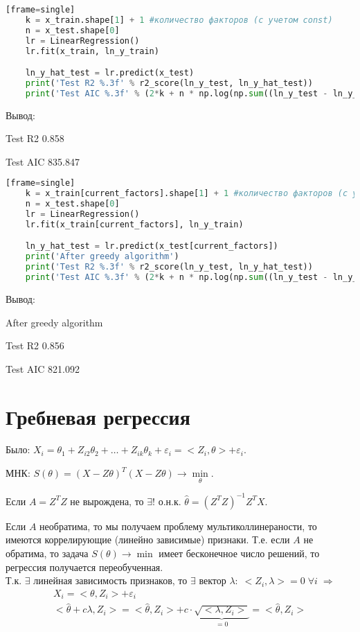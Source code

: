 \begin{lstlisting}[language=Python][frame=single]
	k = x_train.shape[1] + 1 #количество факторов (с учетом const)
	n = x_test.shape[0]
	lr = LinearRegression()
	lr.fit(x_train, ln_y_train)

	ln_y_hat_test = lr.predict(x_test)
	print('Test R2 %.3f' % r2_score(ln_y_test, ln_y_hat_test))
	print('Test AIC %.3f' % (2*k + n * np.log(np.sum((ln_y_test - ln_y_hat_test) ** 2))) )
\end{lstlisting}

	Вывод:
	
	Test R2 0.858
	
	Test AIC 835.847

\begin{lstlisting}[language=Python][frame=single]
	k = x_train[current_factors].shape[1] + 1 #количество факторов (с учетом const)
	n = x_test.shape[0]
	lr = LinearRegression()
	lr.fit(x_train[current_factors], ln_y_train)

	ln_y_hat_test = lr.predict(x_test[current_factors])
	print('After greedy algorithm')
	print('Test R2 %.3f' % r2_score(ln_y_test, ln_y_hat_test))
	print('Test AIC %.3f' % (2*k + n * np.log(np.sum((ln_y_test - ln_y_hat_test) ** 2))) )
\end{lstlisting}

	Вывод:
	
	After greedy algorithm
	
	Test R2 0.856
	
	Test AIC 821.092

\section{Гребневая регрессия}\label{cha:linreg2/sec:greb}

Было: $\displaystyle X_i = \theta_1 + Z_{i2}\theta_2 + \dots + Z_{ik} \theta_k + \varepsilon_i = <Z_i, \theta> + \varepsilon_i$.

МНК: $\displaystyle S(\theta) = \left( X - Z \theta \right)^T \left( X - Z \theta \right) \to \underset{\theta}{\min}$.

\begin{theorem}[]\label{lec:greb/the:}
	Если $A = Z^T Z$ не вырождена, то $\exists !$ о.н.к. $\hat{\theta} = \left( Z^T Z \right)^{-1} Z^T X$.
\end{theorem}

Если $A$ необратима, то мы получаем проблему мультиколлинераности, то имеются коррелирующие (линейно зависимые) признаки. Т.е. если $A$ не обратима, то задача $S(\theta) \to \min$ имеет бесконечное число решений, то регрессия получается переобученная.\\
Т.к. $\exists$ линейная зависимость признаков, то $\exists$ вектор $\lambda: \; <Z_i, \lambda> = 0 \; \forall i \; \Rightarrow$
$$\begin{gathered}
	X_i = <\theta, Z_i> + \varepsilon_i \\
	<\hat{\theta} + c \lambda, Z_i> = <\hat{\theta}, Z_i> + c \cdot \underbrace{\sqrt{<\lambda, Z_i>}}_{=0} = <\hat{\theta}, Z_i>
\end{gathered}$$

